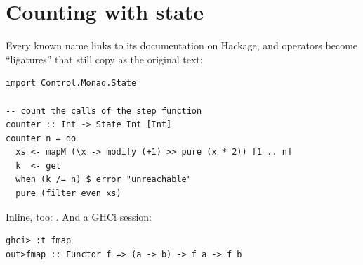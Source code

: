 \documentclass{scrartcl}
\begin{document}
\section*{Counting with state}
Every known name links to its documentation on Hackage, and operators become \enquote{ligatures}
that still copy as the original text:
\begin{verbatim}
import Control.Monad.State

-- count the calls of the step function
counter :: Int -> State Int [Int]
counter n = do
  xs <- mapM (\x -> modify (+1) >> pure (x * 2)) [1 .. n]
  k  <- get
  when (k /= n) $ error "unreachable"
  pure (filter even xs)
\end{verbatim}
Inline, too: . And a GHCi session:
\begin{verbatim}
ghci> :t fmap
out>fmap :: Functor f => (a -> b) -> f a -> f b
\end{verbatim}
\end{document}
